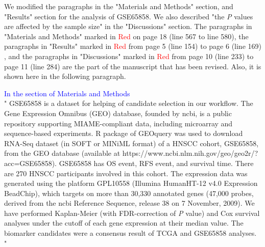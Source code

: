 \documentclass[preprint,12pt]{elsarticle}
\newenvironment{MyIndent}
{\par\leftskip1cm\relax\rightskip1cm\relax}
{\par\leftskip0cm\relax\rightskip0cm\relax}
\newenvironment{MyColorPar}[1]{%
    \leavevmode\color{#1}\ignorespaces%
}{%
}%
\begin{document}
\begin{MyColorPar}{blue}



We modified the paragraphs in the "Materials and Methods" section, and "Results" section for the analysis of GSE65858.
We also described "the \textit{P} values are affected by the sample size" in the "Discussions" section.
The paragraphs in "Materials and Methods" marked in \textcolor{red}{Red} on page 18 (line 567 to line 580),
the paragraphs in "Results" marked in \textcolor{red}{Red} from page 5 (line 154) to page 6 (line 169) , and
the paragraphs in "Discussions" marked in \textcolor{red}{Red} from page 10 (line 233) to page 11 (line 284)
are the part of the manuscript that has been revised. 
Also, it is shown here in the following paragraph.
\\[0.3cm]

\begin{MyIndent}
\begin{MyColorPar}{red}


\textcolor{blue}{In the section of Materials and Methods}\\
"
GSE65858\cite{Wichmann2015} is a dataset for helping of candidate selection in our workflow.
The Gene Expression Omnibus (GEO) database\cite{Chung2006}, founded by \acrfull{ncbi}, is a public repository supporting MIAME-compliant data,  including microarray and sequence-based experiments.
R package of GEOquery\cite{Sean2007} was used to
download RNA-Seq dataset (in SOFT or MINiML format) of a HNSCC cohort, GSE65858, from the GEO database (available at https://www.ncbi.nlm.nih.gov/geo/geo2r/?\\acc=GSE65858). 
GSE65858 has OS event, RFS event, and survival time.
There are 270 HNSCC participants involved in this cohort.
The expression data was generated using the platform GPL10558 (Illumina HumanHT-12 v4.0 Expression BeadChip), which targets on more than 30,330 annotated genes (47,000 probes, derived from the \acrshort{ncbi} Reference Sequence, release 38 on 7 November, 2009). %
We have performed Kaplan-Meier (with FDR-correction of \textit{P} value) and Cox survival analyses under the cutoff of each gene expression at their median value. The biomarker candidates were a consensus result of TCGA and GSE65858 analyses.\\
"


\end{MyColorPar}
\end{MyIndent}
\end{MyColorPar}
\end{document}
